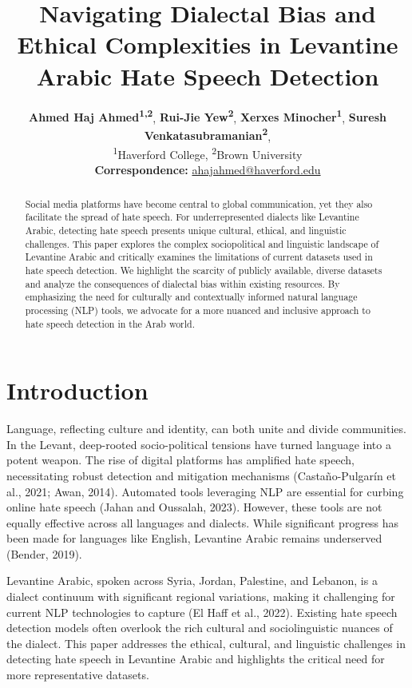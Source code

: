 \documentclass[11pt]{article}
\title{Navigating Dialectal Bias and Ethical Complexities in Levantine Arabic Hate Speech Detection}
\author{
 \textbf{Ahmed Haj Ahmed\textsuperscript{1,2}},
 \textbf{Rui-Jie Yew\textsuperscript{2}},
 \textbf{Xerxes Minocher\textsuperscript{1}},
 \textbf{Suresh Venkatasubramanian\textsuperscript{2}},
\\
 \textsuperscript{1}Haverford College,
 \textsuperscript{2}Brown University
\\
 \small{
   \textbf{Correspondence:} \href{mailto:ahajahmed@haverford.edu}{ahajahmed@haverford.edu}
 }
}
\begin{document}
\maketitle
\begin{abstract}
Social media platforms have become central to global communication, yet they also facilitate the spread of hate speech. For underrepresented dialects like Levantine Arabic, detecting hate speech presents unique cultural, ethical, and linguistic challenges. This paper explores the complex sociopolitical and linguistic landscape of Levantine Arabic and critically examines the limitations of current datasets used in hate speech detection. We highlight the scarcity of publicly available, diverse datasets and analyze the consequences of dialectal bias within existing resources. By emphasizing the need for culturally and contextually informed natural language processing (NLP) tools, we advocate for a more nuanced and inclusive approach to hate speech detection in the Arab world. 
\end{abstract}


\section{Introduction}

Language, reflecting culture and identity, can both unite and divide communities. In the Levant, deep-rooted socio-political tensions have turned language into a potent weapon. The rise of digital platforms has amplified hate speech, necessitating robust detection and mitigation mechanisms (Castaño-Pulgarín et al., 2021; Awan, 2014). Automated tools leveraging NLP are essential for curbing online hate speech (Jahan and Oussalah, 2023). However, these tools are not equally effective across all languages and dialects. While significant progress has been made for languages like English, Levantine Arabic remains underserved (Bender, 2019).

Levantine Arabic, spoken across Syria, Jordan, Palestine, and Lebanon, is a dialect continuum with significant regional variations, making it challenging for current NLP technologies to capture (El Haff et al., 2022). Existing hate speech detection models often overlook the rich cultural and sociolinguistic nuances of the dialect. This paper addresses the ethical, cultural, and linguistic challenges in detecting hate speech in Levantine Arabic and highlights the critical need for more representative datasets.
\end{document}
